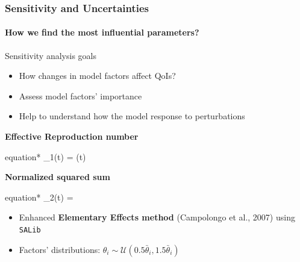 \documentclass{beamer}
\begin{document}
\begin{frame}{\insertsubsection}
\frametitle{Sensitivity and Uncertainties} 
\framesubtitle{How we find the most influential parameters?} 
	\begin{block}{Sensitivity analysis goals}
		\begin{itemize}
			\item How changes in model factors affect QoIs?
			\item Assess model factors' importance
			\item Help to understand how the model response to perturbations
		\end{itemize}
	\end{block}
	\vspace{1em}
	
	\begin{minipage}[b]{0.49\textwidth}
		\begin{center} \textbf{Effective Reproduction number}
			\begin{empheq}[box={\mymath[colback=lncc-color!20, drop lifted shadow]}]{equation*}
			_1(t) = (t)
			\end{empheq}
		\end{center}
	\end{minipage}\hfill
	\begin{minipage}[b]{0.49\textwidth}
		\begin{center} \textbf{Normalized squared sum}
			\begin{empheq}[box={\mymath[colback=lncc-color!20, drop lifted shadow]}]{equation*}
			_2(t) = 
			\end{empheq}
		\end{center}		
	\end{minipage}
	
	\vspace{0.2in}
	\begin{itemize}
		\item Enhanced \textbf{Elementary Effects method} (Campolongo et al., 2007) using \texttt{SALib}
		\item Factors' distributions: $\theta_i \sim \mathcal{U}(0.5\bar{\theta}_i, 1.5\bar{\theta}_i)$

	\end{itemize}
\end{frame}
\end{document}
